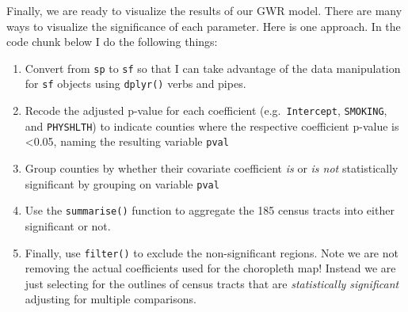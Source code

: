 \documentclass[
]{book}
\providecommand{\tightlist}{%
  \setlength{\itemsep}{0pt}\setlength{\parskip}{0pt}}
\begin{document}
Finally, we are ready to visualize the results of our GWR model. There are many ways to visualize the significance of each parameter. Here is one approach. In the code chunk below I do the following things:

\begin{enumerate}
\def\labelenumi{\arabic{enumi}.}
\tightlist
\item
  Convert from \texttt{sp} to \texttt{sf} so that I can take advantage of the data manipulation for \texttt{sf} objects using \texttt{dplyr()} verbs and pipes.
\item
  Recode the adjusted p-value for each coefficient (e.g.~\texttt{Intercept}, \texttt{SMOKING}, and \texttt{PHYSHLTH}) to indicate counties where the respective coefficient p-value is \textless0.05, naming the resulting variable \texttt{pval}
\item
  Group counties by whether their covariate coefficient \emph{is} or \emph{is not} statistically significant by grouping on variable \texttt{pval}
\item
  Use the \texttt{summarise()} function to aggregate the 185 census tracts into either significant or not.
\item
  Finally, use \texttt{filter()} to exclude the non-significant regions. Note we are not removing the actual coefficients used for the choropleth map! Instead we are just selecting for the outlines of census tracts that are \emph{statistically significant} adjusting for multiple comparisons.
\end{enumerate}
\end{document}
